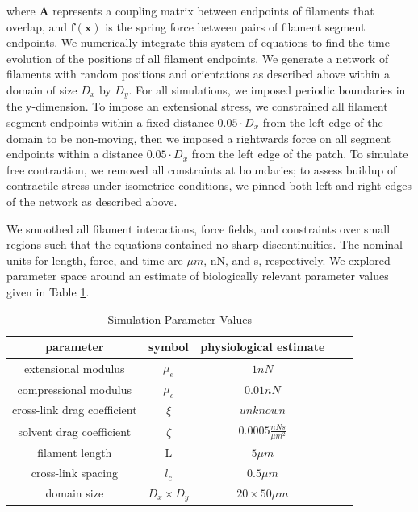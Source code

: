 \documentclass[10pt,letterpaper]{article}
\begin{document}
where $\mathbf{A }$ represents a coupling matrix between endpoints of filaments that overlap, and $\mathbf{f(x)}$ is the spring force between pairs of filament segment endpoints.   We numerically integrate this system of equations to find the time evolution of the positions of all filament endpoints. We generate a network of filaments with random positions and orientations as described above within a domain of size $D_x$ by $D_y$.  For all simulations, we imposed periodic boundaries in the y-dimension. To impose an extensional stress, we constrained all filament segment endpoints within a fixed distance $0.05\cdot D_x$ from the left edge of the domain to be non-moving, then we imposed a rightwards force on all segment endpoints within a distance $0.05\cdot D_x$ from the left edge of the patch.   To simulate free contraction, we removed all constraints at boundaries; to assess buildup of contractile stress under isometricc conditions, we pinned both left and right edges of the network as described above.




We smoothed all filament interactions, force fields, and constraints over small regions such that the equations contained no sharp discontinuities. The nominal units for length, force, and time are $\mu m$, nN, and s, respectively.  We explored parameter space around an estimate of biologically relevant parameter values given in Table \ref{table:para}. 

\begin{table}[h]
\centering
\caption{Simulation Parameter Values}
\label{table:para}
\begin{tabular}{|c|c|c|c|c|}
\hline
{\bf parameter}             & {\bf symbol} & {\bf physiological estimate}          \\ \hline
extensional modulus         & $\mu_e$        & $1 nN $                                               \\
compressional modulus             & $\mu_c$     & $ 0.01 nN $                           \\
cross-link drag coefficient & $\xi$      & $unknown $              \\
solvent drag coefficient     & $\zeta$        & $0.0005 \frac{nN s}{\mu m^2} $      \\
filament length             & L            & $5 \mu m$                                          \\
cross-link spacing          & $l_c$        & $0.5 \mu m$                                         \\
domain size                 & $D_x\times D_y$            & $20\times 50 \mu m$                                 \\ \hline
\end{tabular}
\end{table}
\end{document}

